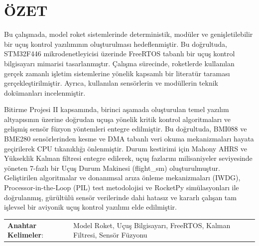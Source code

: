 \clearpage
\section*{ÖZET}
\label{ozet}



\par Bu çalışmada, model roket sistemlerinde deterministik, modüler ve genişletilebilir bir uçuş kontrol yazılımının oluşturulması hedeflenmiştir. Bu doğrultuda, STM32F446 mikrodenetleyicisi üzerinde FreeRTOS tabanlı bir uçuş kontrol bilgisayarı mimarisi tasarlanmıştır. Çalışma sürecinde, roketlerde kullanılan gerçek zamanlı işletim sistemlerine yönelik kapsamlı bir literatür taraması gerçekleştirilmiştir. Ayrıca, kullanılan sensörlerin ve modüllerin teknik dokümanları incelenmiştir.

\par Bitirme Projesi II kapsamında, birinci aşamada oluşturulan temel yazılım altyapısının üzerine doğrudan uçuşa yönelik kritik kontrol algoritmaları ve gelişmiş sensör füzyon yöntemleri entegre edilmiştir. Bu doğrultuda, BMI088 ve BME280 sensörlerinden kesme ve DMA tabanlı veri okuma mekanizmaları hayata geçirilerek CPU tıkanıklığı önlenmiştir. Durum kestirimi için Mahony AHRS ve Yükseklik Kalman filtresi entegre edilerek, uçuş fazlarını milisaniyeler seviyesinde yöneten 7-fazlı bir Uçuş Durum Makinesi (flight\_sm) oluşturulmuştur. Geliştirilen algoritmalar ve donanımsal arıza önleme mekanizmaları (IWDG), Processor-in-the-Loop (PIL) test metodolojisi ve RocketPy simülasyonları ile doğrulanmış, gürültülü sensör verilerinde dahi hatasız ve kararlı çalışan tam işlevsel bir aviyonik uçuş kontrol yazılımı elde edilmiştir.


\vspace{3mm}

 \begin{tabular}{ll}
 	{\textbf{Anahtar Kelimeler}:} & {Model Roket, Uçuş Bilgisayarı, FreeRTOS, Kalman Filtresi, Sensör Füzyonu}  \\   	
 \end{tabular} 




 


